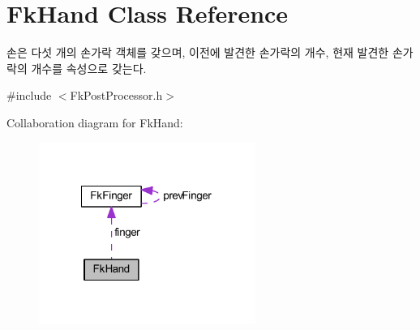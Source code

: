 \hypertarget{class_fk_hand}{}\section{Fk\+Hand Class Reference}
\label{class_fk_hand}


손은 다섯 개의 손가락 객체를 갖으며, 이전에 발견한 손가락의 개수, 현재 발견한 손가락의 개수를 속성으로 갖는다.  




{\ttfamily \#include $<$Fk\+Post\+Processor.\+h$>$}



Collaboration diagram for Fk\+Hand\+:\nopagebreak
\begin{figure}[H]
\begin{center}
\leavevmode
\includegraphics[width=200pt]{class_fk_hand__coll__graph}
\end{center}
\end{figure}
